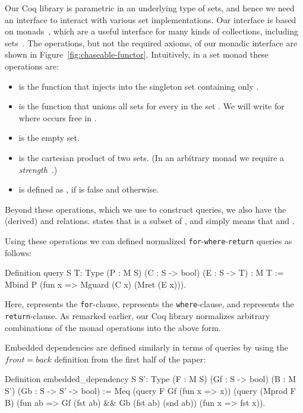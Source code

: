 \documentclass[preprint]{sigplanconf}
\begin{document}
Our Coq library is parametric in an underlying type of sets, and hence we need an interface to interact with various set implementations.  Our interface is based on monads~\cite{monad}, which are a useful interface for many kinds of collections, including sets~\cite{monad}.  The operations, but not the required axioms, of our monadic interface are shown in Figure~\ref{fig:chaseable-functor}.  Intuitively, in a set monad these operations are:
\begin{itemize}
\item {} is the function that injects  into the singleton set containing only .
\item {} is the function that unions all sets  for every  in the set .  We will write  for  where  occurs free in .
\item {} is the empty set.
\item {} is the cartesian product of two sets.  (In an arbitrary monad we require a {\it strength}~\cite{BW}.)
\item {} is defined as , if  is false and  otherwise.
\end{itemize}
Beyond these operations, which we use to construct queries, we also have the (derived)  and  relations.
 states that  is a subset of , and  simply means that  and .

Using these operations we can defined normalized {\tt for}-{\tt where}-{\tt return} queries as follows:
\begin{coq}
Definition query {S T: Type}
  (P : M S) (C : S -> bool) (E : S -> T) : M T :=
  Mbind P (fun x => Mguard (C x) (Mret (E x))).
\end{coq}
Here,  represents the {\tt for}-clause,  represents the {\tt where}-clause, and  represents the {\tt return}-clause.  As remarked earlier, our Coq library normalizes arbitrary combinations of the monad operations into the above form.

Embedded dependencies are defined similarly in terms of queries by using the $front = back$ definition from the first half of the paper: 
\begin{coq}
Definition embedded_dependency {S S': Type}
  (F : M S) (Gf : S -> bool) (B : M S') (Gb : S -> S' -> bool)
:= Meq (query F Gf (fun x => x))
       (query (Mprod F B)
              (fun ab => Gf (fst ab) && Gb (fst ab) (snd ab))
              (fun x => fst x)).
\end{coq}
\end{document}
